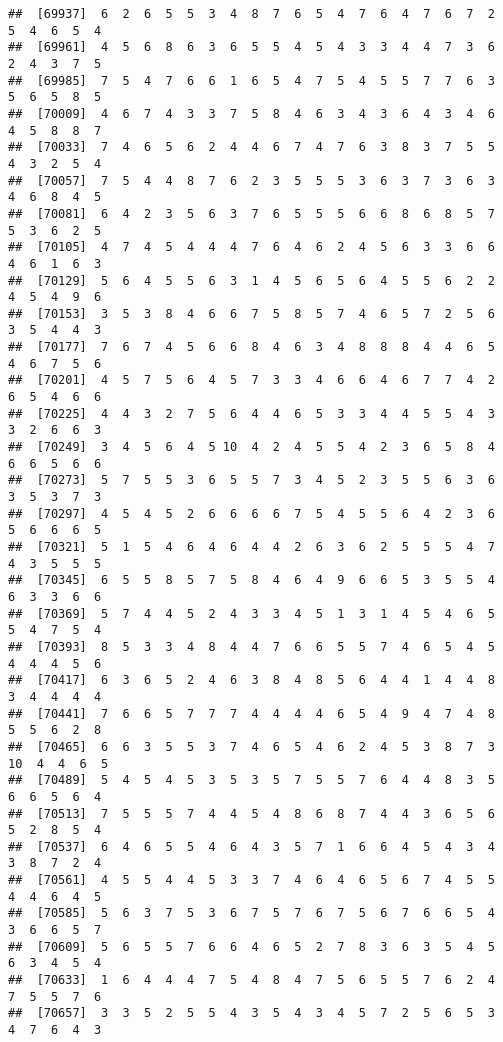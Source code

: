 \documentclass[
]{book}
\begin{document}
\begin{verbatim}
##  [69937]  6  2  6  5  5  3  4  8  7  6  5  4  7  6  4  7  6  7  2  5  4  6  5  4
##  [69961]  4  5  6  8  6  3  6  5  5  4  5  4  3  3  4  4  7  3  6  2  4  3  7  5
##  [69985]  7  5  4  7  6  6  1  6  5  4  7  5  4  5  5  7  7  6  3  5  6  5  8  5
##  [70009]  4  6  7  4  3  3  7  5  8  4  6  3  4  3  6  4  3  4  6  4  5  8  8  7
##  [70033]  7  4  6  5  6  2  4  4  6  7  4  7  6  3  8  3  7  5  5  4  3  2  5  4
##  [70057]  7  5  4  4  8  7  6  2  3  5  5  5  3  6  3  7  3  6  3  4  6  8  4  5
##  [70081]  6  4  2  3  5  6  3  7  6  5  5  5  6  6  8  6  8  5  7  5  3  6  2  5
##  [70105]  4  7  4  5  4  4  4  7  6  4  6  2  4  5  6  3  3  6  6  4  6  1  6  3
##  [70129]  5  6  4  5  5  6  3  1  4  5  6  5  6  4  5  5  6  2  2  4  5  4  9  6
##  [70153]  3  5  3  8  4  6  6  7  5  8  5  7  4  6  5  7  2  5  6  3  5  4  4  3
##  [70177]  7  6  7  4  5  6  6  8  4  6  3  4  8  8  8  4  4  6  5  4  6  7  5  6
##  [70201]  4  5  7  5  6  4  5  7  3  3  4  6  6  4  6  7  7  4  2  6  5  4  6  6
##  [70225]  4  4  3  2  7  5  6  4  4  6  5  3  3  4  4  5  5  4  3  3  2  6  6  3
##  [70249]  3  4  5  6  4  5 10  4  2  4  5  5  4  2  3  6  5  8  4  6  6  5  6  6
##  [70273]  5  7  5  5  3  6  5  5  7  3  4  5  2  3  5  5  6  3  6  3  5  3  7  3
##  [70297]  4  5  4  5  2  6  6  6  6  7  5  4  5  5  6  4  2  3  6  5  6  6  6  5
##  [70321]  5  1  5  4  6  4  6  4  4  2  6  3  6  2  5  5  5  4  7  4  3  5  5  5
##  [70345]  6  5  5  8  5  7  5  8  4  6  4  9  6  6  5  3  5  5  4  6  3  3  6  6
##  [70369]  5  7  4  4  5  2  4  3  3  4  5  1  3  1  4  5  4  6  5  5  4  7  5  4
##  [70393]  8  5  3  3  4  8  4  4  7  6  6  5  5  7  4  6  5  4  5  4  4  4  5  6
##  [70417]  6  3  6  5  2  4  6  3  8  4  8  5  6  4  4  1  4  4  8  3  4  4  4  4
##  [70441]  7  6  6  5  7  7  7  4  4  4  4  6  5  4  9  4  7  4  8  5  5  6  2  8
##  [70465]  6  6  3  5  5  3  7  4  6  5  4  6  2  4  5  3  8  7  3 10  4  4  6  5
##  [70489]  5  4  5  4  5  3  5  3  5  7  5  5  7  6  4  4  8  3  5  6  6  5  6  4
##  [70513]  7  5  5  5  7  4  4  5  4  8  6  8  7  4  4  3  6  5  6  5  2  8  5  4
##  [70537]  6  4  6  5  5  4  6  4  3  5  7  1  6  6  4  5  4  3  4  3  8  7  2  4
##  [70561]  4  5  5  4  4  5  3  3  7  4  6  4  6  5  6  7  4  5  5  4  4  6  4  5
##  [70585]  5  6  3  7  5  3  6  7  5  7  6  7  5  6  7  6  6  5  4  3  6  6  5  7
##  [70609]  5  6  5  5  7  6  6  4  6  5  2  7  8  3  6  3  5  4  5  6  3  4  5  4
##  [70633]  1  6  4  4  4  7  5  4  8  4  7  5  6  5  5  7  6  2  4  7  5  5  7  6
##  [70657]  3  3  5  2  5  5  4  3  5  4  3  4  5  7  2  5  6  5  3  4  7  6  4  3

\end{verbatim}
\end{document}
